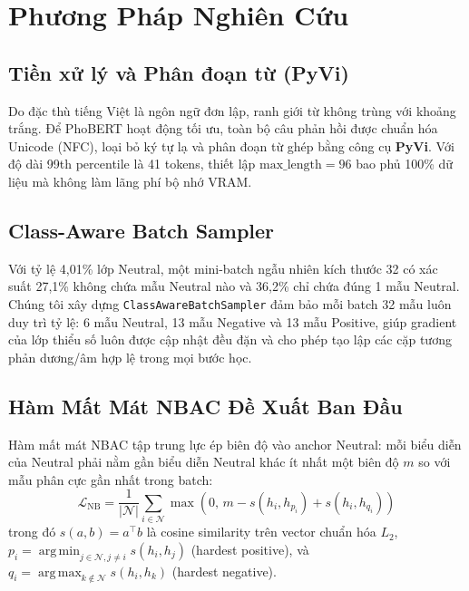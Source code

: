 \documentclass[10pt,journal,compsoc]{IEEEtran}
\DeclareMathOperator*{\argmin}{arg\,min}
\DeclareMathOperator*{\argmax}{arg\,max}
\begin{document}
\section{Phương Pháp Nghiên Cứu}

\subsection{Tiền xử lý và Phân đoạn từ (PyVi)}
Do đặc thù tiếng Việt là ngôn ngữ đơn lập, ranh giới từ không trùng với khoảng trắng. Để PhoBERT hoạt động tối ưu, toàn bộ câu phản hồi được chuẩn hóa Unicode (NFC), loại bỏ ký tự lạ và phân đoạn từ ghép bằng công cụ \textbf{PyVi}. Với độ dài 99th percentile là 41 tokens, thiết lập $\text{max\_length} = 96$ bao phủ 100\% dữ liệu mà không làm lãng phí bộ nhớ VRAM.

\subsection{Class-Aware Batch Sampler}
Với tỷ lệ 4,01\% lớp Neutral, một mini-batch ngẫu nhiên kích thước 32 có xác suất 27,1\% không chứa mẫu Neutral nào và 36,2\% chỉ chứa đúng 1 mẫu Neutral. Chúng tôi xây dựng \texttt{ClassAwareBatchSampler} đảm bảo mỗi batch 32 mẫu luôn duy trì tỷ lệ: 6 mẫu Neutral, 13 mẫu Negative và 13 mẫu Positive, giúp gradient của lớp thiểu số luôn được cập nhật đều đặn và cho phép tạo lập các cặp tương phản dương/âm hợp lệ trong mọi bước học.

\subsection{Hàm Mất Mát NBAC Đề Xuất Ban Đầu}
Hàm mất mát NBAC tập trung lực ép biên độ vào anchor Neutral: mỗi biểu diễn của Neutral phải nằm gần biểu diễn Neutral khác ít nhất một biên độ $m$ so với mẫu phân cực gần nhất trong batch:
\begin{equation}
\mathcal{L}_{\text{NB}} = \frac{1}{|\mathcal{N}|} \sum_{i \in \mathcal{N}} \max\left(0,\, m - s(h_i, h_{p_i}) + s(h_i, h_{q_i})\right)
\end{equation}
trong đó $s(a, b) = a^\top b$ là cosine similarity trên vector chuẩn hóa $L_2$, $p_i = \argmin_{j \in \mathcal{N}, j \neq i} s(h_i, h_j)$ (hardest positive), và $q_i = \argmax_{k \notin \mathcal{N}} s(h_i, h_k)$ (hardest negative).
\end{document}
